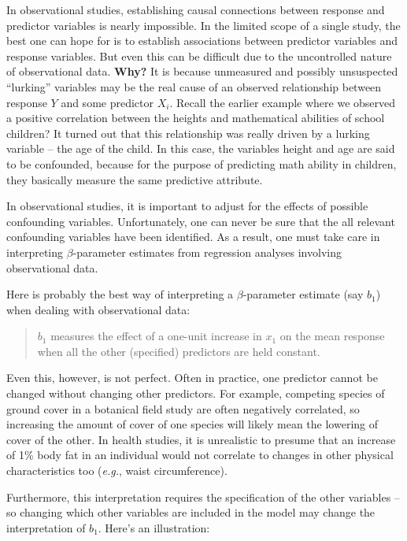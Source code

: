 \documentclass[
]{book}
\begin{document}
In observational studies, establishing causal connections between response and predictor variables is nearly impossible.
In the limited scope of a single study, the best one can hope for is to establish associations between predictor variables and response variables.
But even this can be difficult due to the uncontrolled nature of observational data.
\textbf{Why?} It is because unmeasured and possibly unsuspected ``lurking'' variables may be the real cause of an observed relationship between response \(Y\) and some predictor \(X_i\).
Recall the earlier example where we observed a positive correlation between the heights and mathematical abilities of school children?
It turned out that this relationship was really driven by a lurking variable -- the age of the child.
In this case, the variables height and age are said to be confounded, because for the purpose of predicting math ability in children, they basically measure the same predictive attribute.

In observational studies, it is important to adjust for the effects of possible confounding variables.
Unfortunately, one can never be sure that the all relevant confounding variables have been identified.
As a result, one must take care in interpreting \(\beta\)-parameter estimates from regression analyses involving observational data.

Here is probably the best way of interpreting a \(\beta\)-parameter estimate (say \(b_1\)) when dealing with observational data:

\begin{quote}
\(b_1\) measures the effect of a one-unit increase in \(x_1\) on the mean response when all the other (specified) predictors are held constant.
\end{quote}

Even this, however, is not perfect.
Often in practice, one predictor cannot be changed without changing other predictors.
For example, competing species of ground cover in a botanical field study are often negatively correlated, so increasing the amount of cover of one species will likely mean the lowering of cover of the other.
In health studies, it is unrealistic to presume that an increase of 1\% body fat in an individual would not correlate to changes in other physical characteristics too (\emph{e.g.}, waist circumference).

Furthermore, this interpretation requires the specification of the other variables -- so changing which other variables are included in the model may change the interpretation of \(b_1\).
Here's an illustration:
\end{document}
